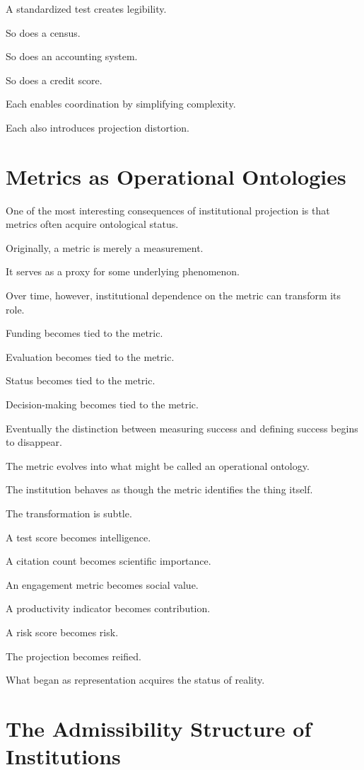 \documentclass[11pt,oneside,openany]{book}
\begin{document}
A standardized test creates legibility.

So does a census.

So does an accounting system.

So does a credit score.

Each enables coordination by simplifying complexity.

Each also introduces projection distortion.

\section{Metrics as Operational Ontologies}

One of the most interesting consequences of institutional projection is that metrics often acquire ontological status.

Originally, a metric is merely a measurement.

It serves as a proxy for some underlying phenomenon.

Over time, however, institutional dependence on the metric can transform its role.

Funding becomes tied to the metric.

Evaluation becomes tied to the metric.

Status becomes tied to the metric.

Decision-making becomes tied to the metric.

Eventually the distinction between measuring success and defining success begins to disappear.

The metric evolves into what might be called an operational ontology.

The institution behaves as though the metric identifies the thing itself.

The transformation is subtle.

A test score becomes intelligence.

A citation count becomes scientific importance.

An engagement metric becomes social value.

A productivity indicator becomes contribution.

A risk score becomes risk.

The projection becomes reified.

What began as representation acquires the status of reality.

\section{The Admissibility Structure of Institutions}
\end{document}
